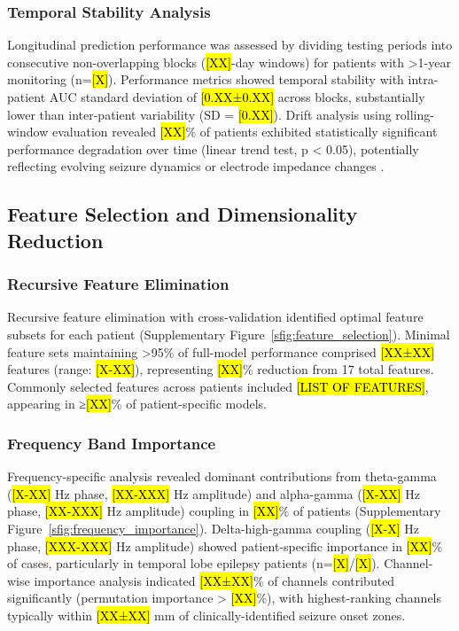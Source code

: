\subsubsection{Temporal Stability Analysis}
Longitudinal prediction performance was assessed by dividing testing periods into consecutive non-overlapping blocks (\hl{[XX]}-day windows) for patients with >1-year monitoring (n=\hl{[X]}). Performance metrics showed temporal stability with intra-patient AUC standard deviation of \hl{[0.XX±0.XX]} across blocks, substantially lower than inter-patient variability (SD = \hl{[0.XX]}). Drift analysis using rolling-window evaluation revealed \hl{[XX]}\% of patients exhibited statistically significant performance degradation over time (linear trend test, p < 0.05), potentially reflecting evolving seizure dynamics or electrode impedance changes \cite{Rakowska2021LongTEQ}.

\subsection{Feature Selection and Dimensionality Reduction}
\subsubsection{Recursive Feature Elimination}
Recursive feature elimination with cross-validation identified optimal feature subsets for each patient (Supplementary Figure~\ref{sfig:feature_selection}). Minimal feature sets maintaining >95\% of full-model performance comprised \hl{[XX±XX]} features (range: \hl{[X-XX]}), representing \hl{[XX]}\% reduction from 17 total features. Commonly selected features across patients included \hl{[LIST OF FEATURES]}, appearing in ≥\hl{[XX]}\% of patient-specific models.

\subsubsection{Frequency Band Importance}
Frequency-specific analysis revealed dominant contributions from theta-gamma (\hl{[X-XX]} Hz phase, \hl{[XX-XXX]} Hz amplitude) and alpha-gamma (\hl{[X-XX]} Hz phase, \hl{[XX-XXX]} Hz amplitude) coupling in \hl{[XX]}\% of patients (Supplementary Figure~\ref{sfig:frequency_importance}). Delta-high-gamma coupling (\hl{[X-X]} Hz phase, \hl{[XXX-XXX]} Hz amplitude) showed patient-specific importance in \hl{[XX]}\% of cases, particularly in temporal lobe epilepsy patients (n=\hl{[X]}/\hl{[X]}). Channel-wise importance analysis indicated \hl{[XX±XX]}\% of channels contributed significantly (permutation importance > \hl{[XX]}\%), with highest-ranking channels typically within \hl{[XX±XX]} mm of clinically-identified seizure onset zones.

